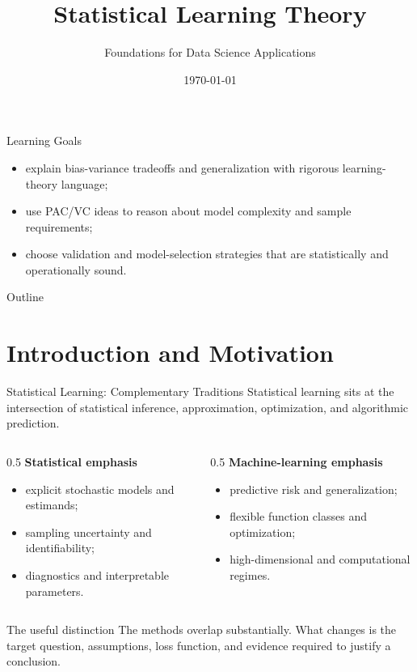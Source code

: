 \documentclass[aspectratio=169,11pt]{beamer}
\title[Statistical Learning Theory]{Statistical Learning Theory}
\subtitle{Foundations for Data Science Applications}
\date{\today}
\begin{document}
\begin{frame}
\titlepage
\end{frame}

\begin{frame}{Learning Goals}
\begin{itemize}
\item explain bias-variance tradeoffs and generalization with rigorous learning-theory language;
\item use PAC/VC ideas to reason about model complexity and sample requirements;
\item choose validation and model-selection strategies that are statistically and operationally sound.
\end{itemize}
\end{frame}

\begin{frame}{Outline}
\tableofcontents
\end{frame}

\section{Introduction and Motivation}

\begin{frame}{Statistical Learning: Complementary Traditions}
  Statistical learning sits at the intersection of statistical inference, approximation, optimization, and algorithmic prediction.

  \begin{columns}
    \begin{column}[t]{0.5\textwidth}
      \textbf{Statistical emphasis}
      \begin{itemize}
        \item explicit stochastic models and estimands;
        \item sampling uncertainty and identifiability;
        \item diagnostics and interpretable parameters.
      \end{itemize}
    \end{column}
    \begin{column}[t]{0.5\textwidth}
      \textbf{Machine-learning emphasis}
      \begin{itemize}
        \item predictive risk and generalization;
        \item flexible function classes and optimization;
        \item high-dimensional and computational regimes.
      \end{itemize}
    \end{column}
  \end{columns}

  \vspace{0.4em}

  \begin{alertblock}{The useful distinction}
    The methods overlap substantially. What changes is the target question, assumptions, loss function, and evidence required to justify a conclusion.
  \end{alertblock}
\end{frame}
\end{document}
